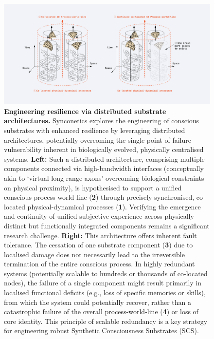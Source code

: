 \documentclass[10pt]{article}
\begin{document}
\begin{sloppypar}
  \begin{figure}[ht!]
    \centering
    \includegraphics[width=\textwidth]{figures/co-located_4D-process-world-line.png}
    \caption[Engineering resilience via distributed substrate architectures]{\textbf{Engineering resilience via distributed substrate architectures.} Synconetics explores the engineering of conscious substrates with enhanced resilience by leveraging distributed architectures, potentially overcoming the single-point-of-failure vulnerability inherent in biologically evolved, physically centralised systems. \textbf{Left:} Such a distributed architecture, comprising multiple components connected via high-bandwidth interfaces (conceptually akin to ‘virtual long-range axons’ overcoming biological constraints on physical proximity), is hypothesised to support a unified conscious process-world-line (\textbf{2}) through precisely synchronised, co-located physical-dynamical processes (\textbf{1}). Verifying the emergence and continuity of unified subjective experience across physically distinct but functionally integrated components remains a significant research challenge. \textbf{Right:} This architecture offers inherent fault tolerance. The cessation of one substrate component (\textbf{3}) due to localised damage does not necessarily lead to the irreversible termination of the entire conscious process. In highly redundant systems (potentially scalable to hundreds or thousands of co-located nodes), the failure of a single component might result primarily in localised functional deficits (e.g., loss of specific memories or skills), from which the system could potentially recover, rather than a catastrophic failure of the overall process-world-line (\textbf{4}) or loss of core identity. This principle of scalable redundancy is a key strategy for engineering robust Synthetic Consciousness Substrates (SCS).}
    \label{fig:resilience-redundancy}
  \end{figure}


\end{sloppypar}
\end{document}
